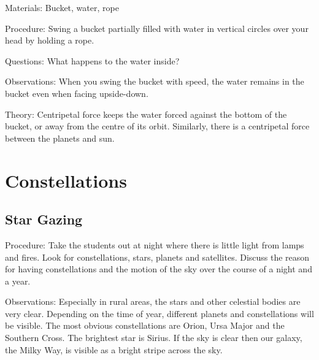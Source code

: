 \begin{multicols}{2}
\begin{description*}
\item[Materials:]{Bucket, water, rope}
\item[Procedure:]{Swing a bucket partially filled with water in vertical circles over your head by holding a rope.}
\item[Questions:]{What happens to the water inside?}
\item[Observations:]{When you swing the bucket with speed, the water remains in the bucket even when facing upside-down.}
\item[Theory:]{Centripetal force keeps the water forced against the bottom of the bucket, or away from the centre of its orbit. Similarly, there is a centripetal force between the planets and sun.}
\end{description*}


\section*{Constellations}


\subsection{Star Gazing}


\begin{description*}
\item[Procedure:]{Take the students out at night where there is little light from lamps and fires. Look for constellations, stars, planets and satellites. Discuss the reason for having constellations and the motion of the sky over the course of a night and a year.}
\item[Observations:]{Especially in rural areas, the stars and other celestial bodies are very clear. Depending on the time of year, different planets and constellations will be visible. The most obvious constellations are Orion, Ursa Major and the Southern Cross. The brightest star is Sirius. If the sky is clear then our galaxy, the Milky Way, is visible as a bright stripe across the sky.}
\end{description*}


\end{multicols}
